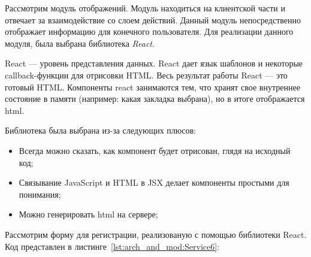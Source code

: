 Рассмотрим модуль отображений. Модуль находиться на клиентской части и отвечает за взаимодействие со слоем действий. Данный модуль непосредственно отображает информацию для конечного пользователя. 
Для реализации данного модуля, была выбрана библиотека \textit{React}. 

React --- уровень представления данных. React дает язык шаблонов и некоторые callback-функции для отрисовки HTML. Весь результат работы React --- это готовый HTML. Компоненты react занимаются тем, что хранят свое внутреннее состояние в памяти (например: какая закладка выбрана), но в итоге отображается html. 

Библиотека была выбрана из-за следующих плюсов:
\begin{itemize}
	\item Всегда можно сказать, как компонент будет отрисован, глядя на исходный код;
	\item Связывание JavaScript и HTML в JSX делает компоненты простыми для понимания;
	\item Можно генерировать html на сервере;
\end{itemize}

Рассмотрим форму для регистрации, реализованую с помощью библиотеки React. Код представлен в листинге~\ref{lst:arch_and_mod:Service6}:

